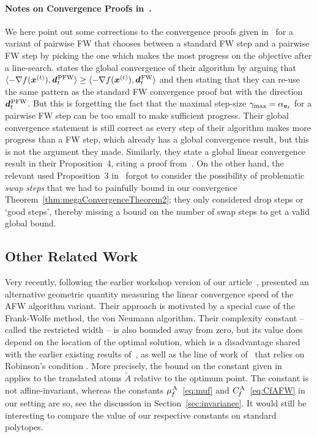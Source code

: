 \documentclass{article} %
\newcommand{\stepsize}{\gamma}
\newcommand{\stepmax}{\stepsize_{\textnormal{\scriptsize max}}} %
\newcommand{\FW}{{\hspace{0.05em}\textnormal{FW}}}
\newcommand{\PFW}{{\hspace{0.05em}\textnormal{PFW}}}
\newcommand{\away}{{\hspace{0.06em}\textnormal{\scriptsize A}}}
\newcommand{\CfAFW}{C_{\hspace{-0.08em}f}^\away}
\newcommand{\strongConvAFW}{\mu_{\hspace{-0.08em}f}^\away}
\newcommand{\x}{\bm{x}}
\newcommand{\dd}{\bm{d}}
\newcommand{\vv}{\bm{v}} %
\newcommand{\innerProdCompressed}[2]{\langle #1 , #2 \rangle}
\newcommand{\0}{\mathbf{0}} %
\begin{document}
\paragraph{Notes on Convergence Proofs in~\cite{Nanculef:2014bj}.}
We here point out some corrections to the convergence proofs given in~\cite{Nanculef:2014bj}
for a variant of pairwise FW that chooses between a standard FW step
and a pairwise FW step by picking the one which makes the most progress
on the objective after a line-search. \cite[Proposition~$1$]{Nanculef:2014bj}
states the global convergence of their algorithm by arguing that
$\innerProdCompressed{-\nabla f(\x^{(t)})}{\dd_t^\PFW}  \geq \innerProdCompressed{-\nabla f(\x^{(t)})}{\dd_t^\FW}$ and then stating that they can re-use the same pattern 
as the standard FW
convergence proof but with the direction $\dd_t^\PFW$. But this
is forgetting the fact that the maximal step-size $\stepmax = \alpha_{\vv_t}$ for
a pairwise FW step can be too small to make sufficient progress.
Their global convergence statement is still correct as every step
of their algorithm
makes more progress than a FW step, 
which already has a global convergence result, 
but this is not the argument they made. Similarly, 
they state a global linear convergence result in their Proposition~4,
citing a proof from~.
On the other hand, the relevant used Proposition~3 in~
forgot to consider the possibility of problematic \emph{swap steps} that 
we had to painfully bound in our convergence 
Theorem~\ref{thm:megaConvergenceTheorem2}; they only
considered drop steps or `good steps', thereby missing a bound on the number of swap steps to
get a valid global bound.


\subsection{Other Related Work} \label{app:PenaDiscussion}
Very recently, following the earlier workshop version of our article~\citep{lacoste2013affine}, \citet{Pena:2015ta} presented an alternative geometric quantity measuring the linear convergence speed of the AFW algorithm variant. Their approach is motivated by a special case of the Frank-Wolfe method, the von Neumann algorithm.
Their complexity constant -- called the restricted width -- is also bounded away from zero, but its value does depend on the location of the optimal solution, which is a disadvantage shared with the earlier existing results of~\citep{Wolfe:1970wy,Guelat:1986fq,Beck:2004jm}, as well as the line of work 
of~ \citep{Ahipasaoglu:2008il,Kumar:2010ku,Nanculef:2014bj} that relies on
Robinson's condition \citep{Robinson:1982ii}.
More precisely, the bound on the constant given in~\citep[Theorem 4]{Pena:2015ta}  applies to the translated atoms $\tilde A$ relative to the optimum point. The  constant is not affine-invariant, whereas the constants $\strongConvAFW$~\eqref{eq:muf} and $\CfAFW$~\eqref{eq:CfAFW} in our setting are so, see the discussion in Section~\ref{sec:invariance}. It would still be interesting to compare
the value of our respective constants on standard polytopes.
\end{document}
